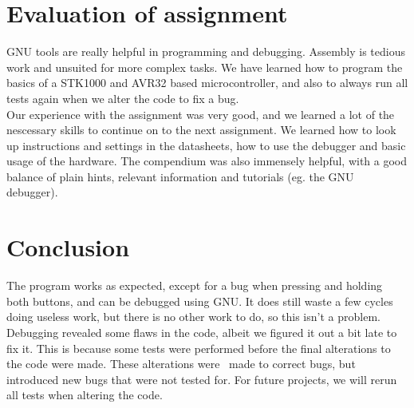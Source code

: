 \section{Evaluation of assignment}


GNU tools are really helpful in programming and debugging. Assembly is tedious work and unsuited for more complex tasks. We have learned how to program the basics of a STK1000 and AVR32 based microcontroller, and also to always run all tests again when we alter the code to fix a bug. \\

Our experience with the assignment was very good, and we learned a lot of the nescessary skills to continue on to the next assignment. We learned how to look up instructions and settings in the datasheets, how to use the debugger and basic usage of the hardware. The compendium was also immensely helpful, with a good balance of plain hints, relevant information and tutorials (eg. the GNU debugger).


\section{Conclusion}

The program works as expected, except for a bug when pressing and holding both buttons, and can be debugged using GNU. It does still waste a few cycles doing useless work, but there is no other work to do, so this isn’t a problem. Debugging revealed some flaws in the code, albeit we figured it out a bit late to fix it. This is because some tests were performed before the final alterations to the code were made. These alterations were  made to correct bugs, but introduced new bugs that were not tested for. For future projects, we will rerun all tests when altering the code.
